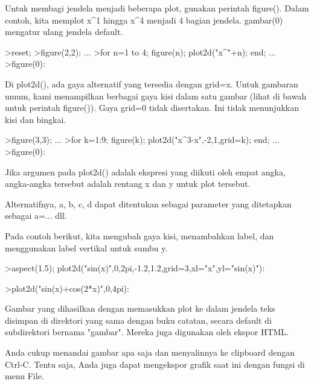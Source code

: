 \documentclass{article}
\begin{document}
\begin{eulernotebook}
\begin{eulercomment}
\begin{eulercomment}
\begin{eulercomment}
\begin{eulercomment}
\begin{eulercomment}
\begin{eulercomment}
\begin{eulercomment}
Untuk membagi jendela menjadi beberapa plot, gunakan perintah
figure(). Dalam contoh, kita memplot x\textasciicircum{}1 hingga x\textasciicircum{}4 menjadi 4 bagian
jendela. gambar(0) mengatur ulang jendela default.
\end{eulercomment}
\begin{eulerprompt}
>reset;
>figure(2,2); ...
>for n=1 to 4; figure(n); plot2d("x^"+n); end; ...
>figure(0):
\end{eulerprompt}
\begin{eulercomment}
Di plot2d(), ada gaya alternatif yang tersedia dengan grid=x. Untuk
gambaran umum, kami menampilkan berbagai gaya kisi dalam satu gambar
(lihat di bawah untuk perintah figure()). Gaya grid=0 tidak
disertakan. Ini tidak menunjukkan kisi dan bingkai.
\end{eulercomment}
\begin{eulerprompt}
>figure(3,3); ...
>for k=1:9; figure(k); plot2d("x^3-x",-2,1,grid=k); end; ...
>figure(0):
\end{eulerprompt}
\begin{eulercomment}
Jika argumen pada plot2d() adalah ekspresi yang diikuti oleh empat
angka, angka-angka tersebut adalah rentang x dan y untuk plot
tersebut.

Alternatifnya, a, b, c, d dapat ditentukan sebagai parameter yang
ditetapkan sebagai a=... dll.

Pada contoh berikut, kita mengubah gaya kisi, menambahkan label, dan
menggunakan label vertikal untuk sumbu y.
\end{eulercomment}
\begin{eulerprompt}
>aspect(1.5); plot2d("sin(x)",0,2pi,-1.2,1.2,grid=3,xl="x",yl="sin(x)"):
\end{eulerprompt}
\begin{eulerprompt}
>plot2d("sin(x)+cos(2*x)",0,4pi):
\end{eulerprompt}
\begin{eulercomment}
Gambar yang dihasilkan dengan memasukkan plot ke dalam jendela teks
disimpan di direktori yang sama dengan buku catatan, secara default di
subdirektori bernama "gambar". Mereka juga digunakan oleh ekspor HTML.

Anda cukup menandai gambar apa saja dan menyalinnya ke clipboard
dengan Ctrl-C. Tentu saja, Anda juga dapat mengekspor grafik saat ini
dengan fungsi di menu File.


\end{eulercomment}
\end{eulercomment}
\end{eulercomment}
\end{eulercomment}
\end{eulercomment}
\end{eulercomment}
\end{eulercomment}
\end{eulernotebook}
\end{document}
